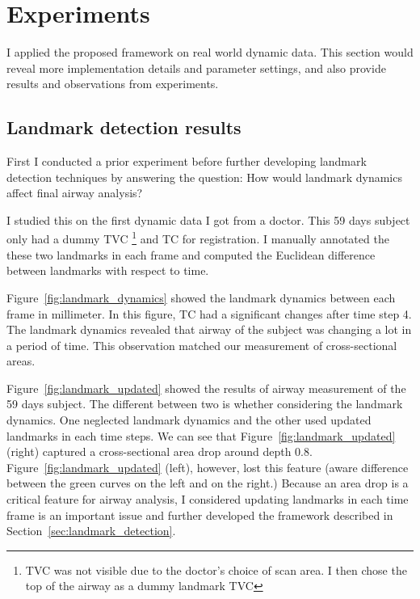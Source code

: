 \section{Experiments}
\label{sec:experiments}
I applied the proposed framework on real world dynamic data.
This section would reveal more implementation details and parameter settings, and also provide results and observations from experiments.

\subsection{Landmark detection results}
\label{sec:landmark_detection_results}
First I conducted a prior experiment before further developing landmark detection techniques by answering the question: How would landmark dynamics affect final airway analysis?

I studied this on the first dynamic data I got from a doctor.
This 59 days subject only had a dummy TVC \footnote{TVC was not visible due to the doctor's choice of scan area. I then chose the top of the airway as a dummy landmark TVC} and TC for registration.
I manually annotated the these two landmarks in each frame and computed the Euclidean difference between landmarks with respect to time.

Figure~\ref{fig:landmark_dynamics} showed the landmark dynamics between each frame in millimeter.
In this figure, TC had a significant changes after time step 4.
The landmark dynamics revealed that airway of the subject was changing a lot in a period of time.
This observation matched our measurement of cross-sectional areas.

Figure~\ref{fig:landmark_updated} showed the results of airway measurement of the 59 days subject.
The different between two is whether considering the landmark dynamics.
One neglected landmark dynamics and the other used updated landmarks in each time steps.
We can see that Figure~\ref{fig:landmark_updated} (right) captured a cross-sectional area drop around depth 0.8.
Figure~\ref{fig:landmark_updated} (left), however, lost this feature (aware difference between the green curves on the left and on the right.)
Because an area drop is a critical feature for airway analysis, I considered updating landmarks in each time frame is an important issue and further developed the framework described in Section~\ref{sec:landmark_detection}.

